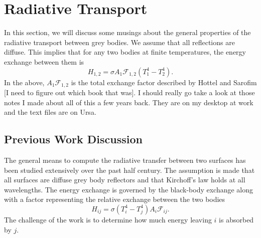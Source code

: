 \section{Radiative Transport}
In this section, we will discuss some musings about the general
properties of the radiative transport between grey bodies.  We assume
that all reflections are diffuse.  This implies that for any two bodies
at finite temperatures, the energy exchange between them is 
\begin{equation}
    H_{1,2} = \sigma A_1\mathcal{F}_{1,2} \left(T_1^4 -T_2^4\right).
\end{equation}
In the above, \(A_1\mathcal{F}_{1,2}\) is the total exchange factor 
described by Hottel and Sarofim [I need to figure out which book that
was].  I should really go take a look at those notes I made about all of
this a few years back.  They are on my desktop at work and the text
files are on Ursa.

\subsection{Previous Work Discussion}
The general means to compute the radiative transfer between two surfaces
has been studied extensively over the past half century.  The assumption
is made that all surfaces are diffuse grey body reflectors and that
Kirchoff's law holds at all wavelengths.  The energy exchange is
governed by the black-body exchange along with a factor representing the
relative exchange between the two bodies
\begin{equation}
    H_{ij} = \sigma(T_i^4 -T_j^4) A_i\mathcal{F}_{ij}.
\end{equation}
The challenge of the work is to determine how much energy leaving \(i\)
is absorbed by \(j\).  

